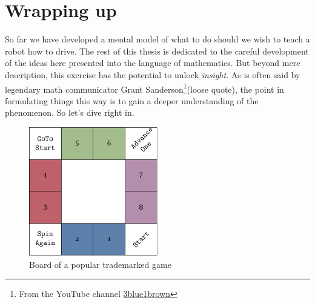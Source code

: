 \section{Wrapping up}
So far we have developed a mental model of what to do should we 
wish to teach a robot how to drive. The rest of this thesis is 
dedicated to the careful development of the ideas here presented 
into the language of mathematics. But beyond mere description, 
this exercise has the potential to unlock \textit{insight}. As 
is often said by legendary math communicator Grant 
Sanderson\footnote{From the YouTube channel 
\href{https://www.youtube.com/channel/UCYO_jab_esuFRV4b17AJtAw}{3blue1brown}}(loose 
quote), the point in formulating things this way is to gain a 
deeper understanding of the phenomenon. So let's dive right in.

\begin{figure}
\centering
\includegraphics[width=0.5\textwidth]{img/board.pdf}
\caption{Board of a popular trademarked game}
\end{figure}
